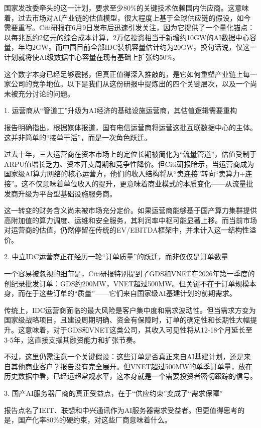 \documentclass[11pt]{ctexart}
\begin{document}
国家发改委牵头的这一计划，要求至少80\%的关键技术依赖国内供应商。这意味着，过去市场对AI产业链的估值模型，很大程度上基于全球供应链的假设，如今需要重写。Citi研报在6月9日发布后迅速引发关注，因为它提供了一个量化锚点：以每兆瓦约2亿元的综合成本计算，2万亿投资相当于新增约10GW的AI数据中心容量，年均2GW。而中国目前全部IDC装机容量估计约为20GW。换句话说，仅这一计划就将使AI级数据中心容量在现有基础上扩张约50\%。

这个数字本身已经足够震撼，但真正值得深入推敲的，是它如何重塑产业链上每一家公司的竞争地位。以下是我们从这份研报中提炼出的四个关键层次，以及一个尚未被充分讨论的问题。

1. 运营商从“管道工”升级为AI经济的基础设施运营商，其估值逻辑需要重构

报告明确指出，根据媒体报道，国有电信运营商将运营这批互联数据中心的主体。这并非简单的“接单干活”，而是一次角色跃迁。

过去十年，三大运营商在资本市场上的定位长期被简化为“流量管道”，估值受制于ARPU值增长乏力、资本开支周期和竞争性降价。但Citi研报暗示，当运营商成为国家级AI算力网络的核心运营方，他们的收入结构将从“卖连接”转向“卖算力+连接”。这不仅意味着单位收入的提升，更意味着商业模式的本质变化——从流量批发商升级为平台型基础设施服务商。

这一转变的财务含义尚未被市场充分定价。如果运营商能够基于国产算力集群提供高附加值的算力调度、运维和安全服务，其利润率中枢可能显著上移。而当前市场对运营商的估值，仍然停留在传统的EV/EBITDA框架中，并未计入这一结构性溢价。

2. 中立IDC运营商正在经历一轮“订单质量”的跃迁，而非仅仅是订单数量

一个容易被忽视的细节是，Citi研报特别提到了GDS和VNET在2026年第一季度的创纪录批发订单：GDS约200MW，VNET超过500MW。但关键不在于订单规模本身，而在于这些订单的“质量”——它们来自国家级AI基建计划的前期需求。

传统上，IDC运营商面临的最大风险是客户集中度和需求波动性。但当需求方变为国家级战略项目，且建设周期明确、资金有保障时，订单的确定性和长期性大幅提升。这意味着，对于GDS和VNET这类公司，其收入可见性将从12-18个月延长至3-5年，这直接支撑其融资能力和扩张节奏。

不过，这里仍需注意一个关键假设：这些订单是否真正来自AI基建计划，还是来自其他商业客户？报告没有完全展开。但VNET超过500MW的单季订单量，放在历史数据中看，已经远超常规水平，这本身就是一个需要投资者密切跟踪的信号。

3. 国产AI服务器厂商的真正受益点，在于“供应约束”变成了“需求保障”

报告点名了IEIT、联想和中兴通讯作为AI服务器需求受益者。但更值得思考的是，国产化率80\%的硬约束，对这些厂商意味着什么。
\end{document}
